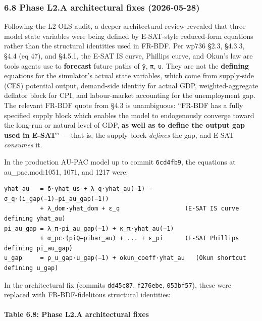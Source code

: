 \documentclass[
]{article}
\begin{document}
\subsubsection{6.8 Phase L2.A architectural fixes
(2026-05-28)}\label{phase-l2.a-architectural-fixes-2026-05-28}

Following the L2 OLS audit, a deeper architectural review revealed that
three model state variables were being defined by E-SAT-style
reduced-form equations rather than the structural identities used in
FR-BDF. Per wp736 §2.3, §4.3.3, §4.4 (eq 47), and §4.5.1, the E-SAT IS
curve, Phillips curve, and Okun's law are tools agents use to
\textbf{forecast} future paths of \texttt{ŷ}, \texttt{π}, \texttt{u}.
They are not the \textbf{defining} equations for the simulator's actual
state variables, which come from supply-side (CES) potential output,
demand-side identity for actual GDP, weighted-aggregate deflator block
for CPI, and labour-market accounting for the unemployment gap. The
relevant FR-BDF quote from §4.3 is unambiguous: ``FR-BDF has a fully
specified supply block which enables the model to endogenously converge
toward the long-run or natural level of GDP, \textbf{as well as to
define the output gap used in E-SAT}'' --- that is, the supply block
\emph{defines} the gap, and E-SAT \emph{consumes} it.

In the production AU-PAC model up to commit \texttt{6cd4fb9}, the
equations at au\_pac.mod:1051, 1071, and 1217 were:

\begin{verbatim}
yhat_au   = δ·yhat_us + λ_q·yhat_au(−1) − σ_q·(i_gap(−1)−pi_au_gap(−1))
          + λ_dom·yhat_dom + ε_q                  (E-SAT IS curve defining yhat_au)
pi_au_gap = λ_π·pi_au_gap(−1) + κ_π·yhat_au(−1)
          + α_pc·(piQ−pibar_au) + ... + ε_pi      (E-SAT Phillips defining pi_au_gap)
u_gap     = ρ_u_gap·u_gap(−1) + okun_coeff·yhat_au   (Okun shortcut defining u_gap)
\end{verbatim}

In the architectural fix (commits \texttt{dd45c87}, \texttt{f276ebe},
\texttt{053bf57}), these were replaced with FR-BDF-fidelitous structural
identities:

\paragraph{Table 6.8: Phase L2.A architectural
fixes}\label{table-6.8-phase-l2.a-architectural-fixes}
\end{document}
